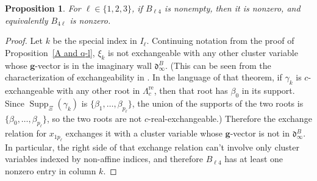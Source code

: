 \documentclass{amsart}
\newtheorem{proposition}{Proposition}[section]
\theoremstyle{definition}
\theoremstyle{remark}
\numberwithin{equation}{section}
\newcommand{\set}[1]{{\lbrace #1 \rbrace}}
\newcommand{\0}{{\mathbf{0}}}
\newcommand{\g}{\mathbf{g}}
\newcommand{\re}{\mathrm{re}}
\renewcommand{\d}{{\mathfrak d}}
\newcommand{\SimplesTChar}{\Xi}
\newcommand{\SuppT}{\operatorname{Supp}_\SimplesTChar}
\newcommand{\APTChar}{\Lambda}
\newcommand{\APT}[1]{\APTChar_{#1}}
\newcommand{\APTre}[1]{\APT{#1}^\re}
\begin{document}
\begin{proposition}\label{not all zeros}
For $\ell\in\set{1,2,3}$, if $B_{\ell4}$ is nonempty, then it is nonzero, and equivalently $B_{4\ell}$ is nonzero.
\end{proposition}
\begin{proof}
Let $k$ be the special index in $I_\ell$.
Continuing notation from the proof of Proposition~\ref{A and q-l}, $\xi_k$ is not exchangeable with any other cluster variable whose $\g$-vector is in the imaginary wall $\d^B_\infty$.
(This can be seen from the characterization of exchangeability in \cite[Theorem~7.2]{affdenom}.
In the language of that theorem, if $\gamma_k$ is $c$-exchangeable with any other root in $\APTre{c}$, then that root has $\beta_0$ in its support.
Since $\SuppT(\gamma_k)$ is $\set{\beta_1,\ldots,\beta_{p_\ell}}$, the union of the supports of the two roots is $\set{\beta_0,\ldots,\beta_{p_\ell}}$, so the two roots are not $c$-real-exchangeable.)
Therefore the exchange relation for $x_{1p_\ell}$ exchanges it with a cluster variable whose $\g$-vector is not in $\d^B_\infty$.  
In particular, the right side of that exchange relation can't involve only cluster variables indexed by non-affine indices, and therefore $B_{\ell4}$ has at least one nonzero entry in column $k$.
\end{proof}
\end{document}
